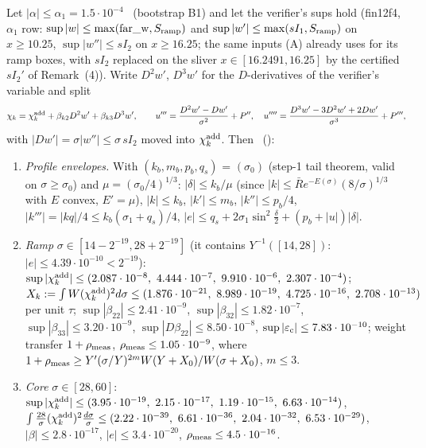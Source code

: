 \begin{lemma}\label{C:lem:bd}
Let $|\alpha|\le\alpha_1=1.5\cdot10^{-4}$ \tH\ (bootstrap B1) and let the verifier's sups hold (fin12f4, $\alpha_1$ row: $\sup|w|\le\max(\mathrm{far\_w},S_{\rm ramp})$ and $\sup|w'|\le\max(sI_1,S_{\rm ramp})$ on $x\ge10.25$, $\sup|w''|\le sI_2$ on $x\ge16.25$; the same inputs (A) already uses for its ramp boxes, with $sI_2$ replaced on the sliver $x\in[16.2491,16.25]$ by the certified $sI_2'$ of Remark~(4)). Write $D^2w'$, $D^3w'$ for the $D$-derivatives of the verifier's variable and split
\[
\chi_k=\chi_k^{\rm add}+\beta_{k2}D^2w'+\beta_{k3}D^3w',\qquad u'''=\frac{D^2w'-Dw'}{\sigma^2}+P'',\quad u''''=\frac{D^3w'-3D^2w'+2Dw'}{\sigma^3}+P''' ,
\]
with $|Dw'|=\sigma|w''|\le\sigma\,sI_2$ moved into $\chi^{\rm add}_k$. Then \tC\ ():
\begin{enumerate}
\item[(i)] \emph{Profile envelopes.} With $(k_b,m_b,p_b,q_s)$ = $(\sigma_0)$ (step-1 tail theorem, valid on $\sigma\ge\sigma_0$) and $\mu=(\sigma_0/4)^{1/3}$: $|\delta|\le k_b/\mu$ (since $|k|\le\bar R e^{-E(\sigma)}(8/\sigma)^{1/3}$ with $E$ convex, $E'=\mu$), $|k|\le k_b$, $|k'|\le m_b$, $|k''|\le p_b/4$, $|k'''|=|kq|/4\le k_b(\sigma_1+q_s)/4$, $|e|\le q_s+2\sigma_1\sin^2\frac\delta2+(p_b+|u|)|\delta|$.
\item[(ii)] \emph{Ramp} $\sigma\in[14-2^{-19},28+2^{-19}]$ (it contains $Y^{-1}([14,28])$: $|e|\le4.39\cdot10^{-10}<2^{-19}$):
$\sup|\chi^{\rm add}_k|\le(2.087\cdot10^{-8},\ 4.444\cdot10^{-7},\ 9.910\cdot10^{-6},\ 2.307\cdot10^{-4})$;
$X_k:=\int W(\chi^{\rm add}_k)^2d\sigma\le(1.876\cdot10^{-21},\ 8.989\cdot10^{-19},\ 4.725\cdot10^{-16},\ 2.708\cdot10^{-13})$ per unit $\tau$;
$\sup|\beta_{22}|\le2.41\cdot10^{-9}$, $\sup|\beta_{32}|\le1.82\cdot10^{-7}$, $\sup|\beta_{33}|\le3.20\cdot10^{-9}$, $\sup|D\beta_{22}|\le8.50\cdot10^{-8}$, $\sup|\varepsilon_{\rm c}|\le7.83\cdot10^{-10}$; weight transfer $1+\rho_{\rm meas}$, $\rho_{\rm meas}\le1.05\cdot10^{-9}$, where $1+\rho_{\rm meas}\ge Y'(\sigma/Y)^{2m}W(Y+X_0)/W(\sigma+X_0)$, $m\le3$.
\item[(iii)] \emph{Core} $\sigma\in[28,60]$: $\sup|\chi^{\rm add}_k|\le(3.95\cdot10^{-19},\ 2.15\cdot10^{-17},\ 1.19\cdot10^{-15},\ 6.63\cdot10^{-14})$, $\int\frac{28}\sigma(\chi^{\rm add}_k)^2\frac{d\sigma}\sigma\le(2.22\cdot10^{-39},\ 6.61\cdot10^{-36},\ 2.04\cdot10^{-32},\ 6.53\cdot10^{-29})$, $|\beta|\le2.8\cdot10^{-17}$, $|e|\le3.4\cdot10^{-20}$, $\rho_{\rm meas}\le4.5\cdot10^{-16}$.

\end{enumerate}
\end{lemma}
